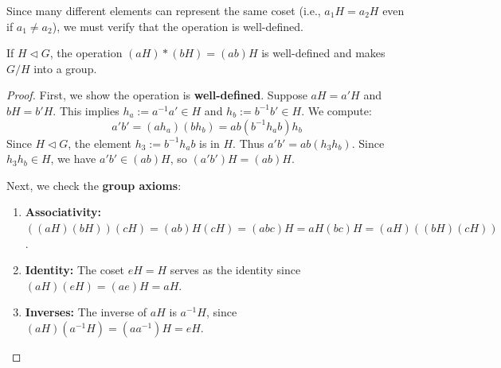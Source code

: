 \begin{remark}
Since many different elements can represent the same coset (i.e., $a_1 H = a_2 H$ even if $a_1 \neq a_2$), we must verify that the operation is well-defined.
\end{remark}

\begin{proposition}
If $H \triangleleft G$, the operation $(aH) * (bH) = (ab)H$ is well-defined and makes $G/H$ into a group.
\end{proposition}

\begin{proof}
First, we show the operation is \textbf{well-defined}. Suppose $aH = a'H$ and $bH = b'H$. This implies $h_a := a^{-1} a' \in H$ and $h_b := b^{-1} b' \in H$. We compute:
\[ a'b' = (ah_a)(bh_b) = a b (b^{-1} h_a b) h_b \]
Since $H \triangleleft G$, the element $h_3 := b^{-1} h_a b$ is in $H$. Thus $a'b' = ab(h_3 h_b)$. Since $h_3 h_b \in H$, we have $a'b' \in (ab)H$, so $(a'b')H = (ab)H$.

Next, we check the \textbf{group axioms}:
\begin{enumerate}
    \item \textbf{Associativity:} $((aH)(bH))(cH) = (ab)H(cH) = (abc)H = aH(bc)H = (aH)((bH)(cH))$.
    \item \textbf{Identity:} The coset $eH = H$ serves as the identity since $(aH)(eH) = (ae)H = aH$.
    \item \textbf{Inverses:} The inverse of $aH$ is $a^{-1}H$, since $(aH)(a^{-1}H) = (aa^{-1})H = eH$.
\end{enumerate}
\end{proof}

